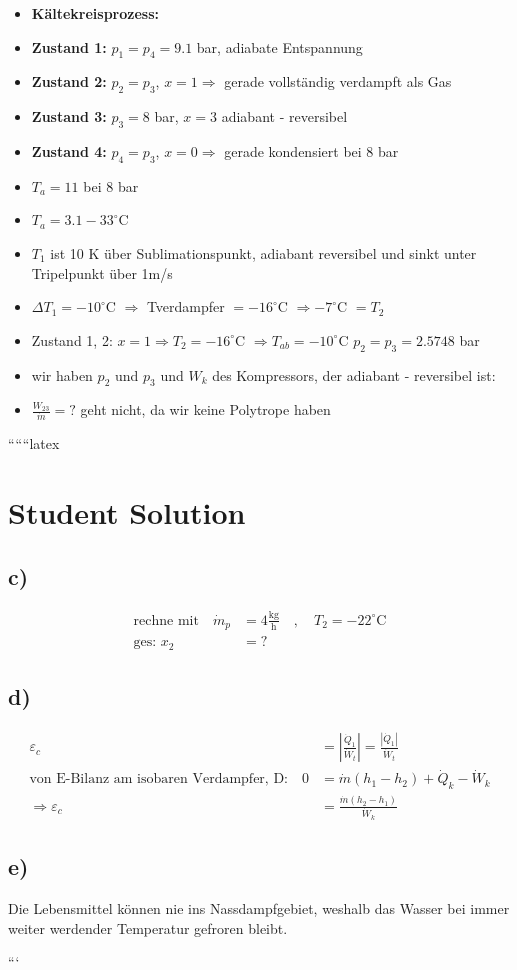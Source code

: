 \begin{itemize}
    \item \textbf{Kältekreisprozess:}
    \item \textbf{Zustand 1:} $p_1 = p_4 = 9.1$ bar, adiabate Entspannung
    \item \textbf{Zustand 2:} $p_2 = p_3$, $x = 1 \Rightarrow$ gerade vollständig verdampft als Gas
    \item \textbf{Zustand 3:} $p_3 = 8$ bar, $x = 3$ adiabant - reversibel
    \item \textbf{Zustand 4:} $p_4 = p_3$, $x = 0 \Rightarrow$ gerade kondensiert bei 8 bar
    \item $T_a = 11$ bei 8 bar
    \item $T_a = 3.1 - 33^\circ$C
    \item $T_1$ ist 10 K über Sublimationspunkt, adiabant reversibel und sinkt unter Tripelpunkt über 1m/s
    \item $\Delta T_1 = -10^\circ$C $\Rightarrow$ Tverdampfer $= -16^\circ$C $\Rightarrow -7^\circ$C $= T_2$
    \item Zustand 1, 2: $x = 1 \Rightarrow T_2 = -16^\circ$C $\Rightarrow T_{ab} = -10^\circ$C $p_2 = p_3 = 2.5748$ bar
    \item wir haben $p_2$ und $p_3$ und $W_k$ des Kompressors, der adiabant - reversibel ist:
    \item $\frac{W_{23}}{\dot{m}} = ?$ geht nicht, da wir keine Polytrope haben
\end{itemize}

``````latex


\section*{Student Solution}

\subsection*{c)}
\begin{align*}
\text{rechne mit} \quad \dot{m}_p &= 4 \frac{\text{kg}}{\text{h}} \quad , \quad T_2 = -22^\circ \text{C} \\
\text{ges: } x_2 &= ?
\end{align*}

\subsection*{d)}
\begin{align*}
\varepsilon_c &= \left| \frac{\dot{Q}_1}{\dot{W}_t} \right| = \frac{|\dot{Q}_1|}{\dot{W}_t} \\
\text{von E-Bilanz am isobaren Verdampfer, D:} \quad 0 &= \dot{m} (h_1 - h_2) + \dot{Q}_k - \dot{W}_k \\
\Rightarrow \varepsilon_c &= \frac{\dot{m} (h_2 - h_1)}{\dot{W}_k}
\end{align*}

\subsection*{e)}
Die Lebensmittel können nie ins Nassdampfgebiet, weshalb das Wasser bei immer weiter werdender Temperatur gefroren bleibt.

```